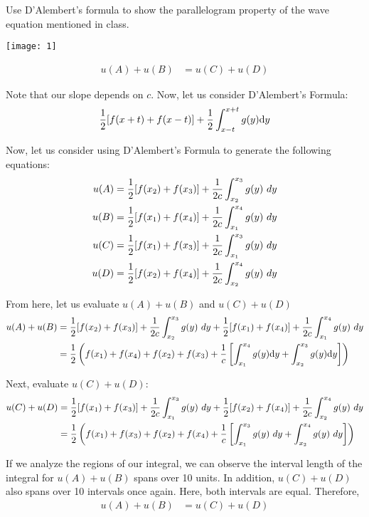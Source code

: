 \item Use D'Alembert's formula to show the parallelogram property of the wave equation mentioned in class.
\bigbreak

\begin{center}
  \texttt{[image: 1]}
\end{center}
%
\begin{align}
  u(A) + u(B) & = u(C) + u(D)
\end{align}

Note that our slope depends on $c$.
Now, let us consider D'Alembert's Formula:
%
\begin{align}
  \frac{1}{2}[f(x + t) + f(x - t)] + \frac{1}{2} \int^{x + t}_{x - t} g(y)
  \text dy
\end{align}

Now, let us consider using D'Alembert's Formula to generate the following equations:
%
\begin{align}
  u(A) & = \frac{1}{2} [f(x_2) + f(x_3)] + \frac{1}{2c} \int^{x_3}_{x_2} g(y) \text\ dy\\
  u(B) & = \frac{1}{2} [f(x_1) + f(x_4)] + \frac{1}{2c} \int^{x_4}_{x_1} g(y) \text\ dy\\
  u(C) & = \frac{1}{2} [f(x_1) + f(x_3)] + \frac{1}{2c} \int^{x_3}_{x_1} g(y) \text\ dy\\
  u(D) & = \frac{1}{2} [f(x_2) + f(x_4)] + \frac{1}{2c} \int^{x_4}_{x_2} g(y) \text\ dy
\end{align}

From here, let us evaluate $u(A) + u(B)$ and $u(C) + u(D)$
%
\begin{align}
  u(A) + u(B) & =
  \frac{1}{2} [f(x_2) + f(x_3)] + \frac{1}{2c} \int^{x_3}_{x_2} g(y) \text\ dy +
  \frac{1}{2} [f(x_1) + f(x_4)] + \frac{1}{2c} \int^{x_4}_{x_1} g(y) \text\ dy\\
  & =
  \frac{1}{2} \left( f(x_1) + f(x_4) + f(x_2) + f(x_3) +
  \frac{1}{c}\left[
  \int^{x_4}_{x_1} g(y) \text dy + \int^{x_3}_{x_2} g(y) \text dy
  \right]\right)
\end{align}

Next, evaluate $u(C) + u(D)$:
%
\begin{align}
  u(C) + u(D) & =
  \frac{1}{2} [f(x_1) + f(x_3)] + \frac{1}{2c} \int^{x_3}_{x_1} g(y) \text\ dy  +
  \frac{1}{2} [f(x_2) + f(x_4)] + \frac{1}{2c} \int^{x_4}_{x_2} g(y) \text\ dy \\
  & = \frac{1}{2}
  \left(
  f(x_1) + f(x_3) + f(x_2) + f(x_4) + \frac{1}{c}
  \left[
  \int^{x_3}_{x_1} g(y) \text\ dy +
  \int^{x_4}_{x_2} g(y) \text\ dy
  \right]
  \right)
\end{align}

If we analyze the regions of our integral, we can observe the interval length of the integral for $u(A) + u(B)$ spans over 10 units. In addition, $u(C) + u(D)$ also spans over 10 intervals once again. Here, both intervals are equal.
Therefore,
%
\begin{align}
  u(A) + u(B) & = u(C) + u(D)
\end{align}
